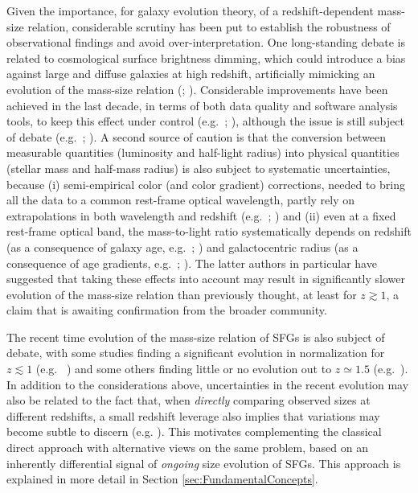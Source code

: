 \documentclass[fleqn,usenatbib]{mnras}
\begin{document}
Given the importance, for galaxy evolution theory, of a redshift-dependent mass-size relation, considerable scrutiny has been put to establish the robustness of observational findings and avoid over-interpretation. One long-standing debate is related to cosmological surface brightness dimming, which could introduce a bias against large and diffuse galaxies at high redshift, artificially mimicking an evolution of the mass-size relation (\citealt{Simard+99}; \citealt{Ravindranath+04}). Considerable improvements have been achieved in the last decade, in terms of both data quality and software analysis tools, to keep this effect under control (e.g.\ \citealt{Barden+12}; \citealt{Paulino-Afonso+17}), although the issue is still subject of debate (e.g.\ \citealt{Ribeiro+16}; \citealt{Whitney+20}). A second source of caution is that the conversion between measurable quantities (luminosity and half-light radius) into physical quantities (stellar mass and half-mass radius) is also subject to systematic uncertainties, because (i) semi-empirical color (and color gradient) corrections, needed to bring all the data to a common rest-frame optical wavelength, partly rely on extrapolations in both wavelength and redshift (e.g.\ \citealt{vdW+14}; \citealt{Hill+17}) and (ii) even at a fixed rest-frame optical band, the mass-to-light ratio systematically depends on redshift (as a consequence of galaxy age, e.g.\ \citealt{Barden+05}; \citealt{Trujillo+06}) and galactocentric radius (as a consequence of age gradients, e.g.\ \citealt{Suess+19a}; \citealt{Mosleh+20}). The latter authors in particular have suggested that taking these effects into account may result in significantly slower evolution of the mass-size relation than previously thought, at least for $z \gtrsim 1$, a claim that is awaiting confirmation from the broader community.

The recent time evolution of the mass-size relation of SFGs is also subject of debate, with some studies finding a significant evolution in normalization for $z \lesssim 1$ (e.g.\ \citealt{Mowla+19}\; \citealt{Nedkova+21}) and some others finding little or no evolution out to $z \simeq 1.5$ (e.g.\ \citealt{Nadolny+21}). In addition to the considerations above, uncertainties in the recent evolution may also be related to the fact that, when \emph{directly} comparing observed sizes at different redshifts, a small redshift leverage also implies that variations may become subtle to discern  (e.g. \citealt{Barone+21}). This motivates complementing the classical direct approach with alternative views on the same problem, based on an inherently differential signal of \emph{ongoing} size evolution of SFGs. This approach is explained in more detail in Section \ref{sec:FundamentalConcepts}.
\end{document}

